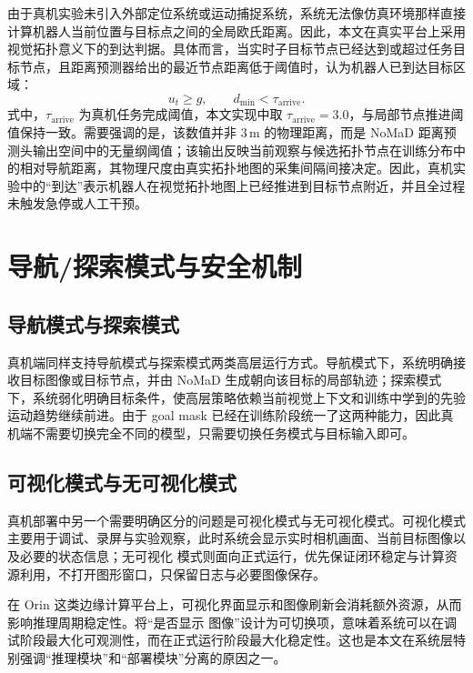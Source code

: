由于真机实验未引入外部定位系统或运动捕捉系统，系统无法像仿真环境那样直接计算机器人当前位置与目标点之间的全局欧氏距离。因此，本文在真实平台上采用视觉拓扑意义下的到达判据。具体而言，当实时子目标节点已经达到或超过任务目标节点，且距离预测器给出的最近节点距离低于阈值时，认为机器人已到达目标区域：
\begin{equation}
u_t \ge g,\qquad d_{\min}<\tau_{\mathrm{arrive}}.
\end{equation}
式中，$\tau_{\mathrm{arrive}}$ 为真机任务完成阈值，本文实现中取 $\tau_{\mathrm{arrive}}=3.0$，与局部节点推进阈值保持一致。需要强调的是，该数值并非 $3\,\mathrm{m}$ 的物理距离，而是 NoMaD 距离预测头输出空间中的无量纲阈值；该输出反映当前观察与候选拓扑节点在训练分布中的相对导航距离，其物理尺度由真实拓扑地图的采集间隔间接决定。因此，真机实验中的“到达”表示机器人在视觉拓扑地图上已经推进到目标节点附近，并且全过程未触发急停或人工干预。

\section{导航/探索模式与安全机制}

\subsection{导航模式与探索模式}

真机端同样支持导航模式与探索模式两类高层运行方式。导航模式下，系统明确接收目标图像或目标节点，并由 NoMaD
生成朝向该目标的局部轨迹；探索模式下，系统弱化明确目标条件，使高层策略依赖当前视觉上下文和训练中学到的先验运动趋势继续前进。由于 goal mask
已经在训练阶段统一了这两种能力\cite{nomad2023}，因此真机端不需要切换完全不同的模型，只需要切换任务模式与目标输入即可。


\subsection{可视化模式与无可视化模式}

真机部署中另一个需要明确区分的问题是可视化模式与无可视化模式。可视化模式主要用于调试、录屏与实验观察，此时系统会显示实时相机画面、当前目标图像以及必要的状态信息；无可视化
模式则面向正式运行，优先保证闭环稳定与计算资源利用，不打开图形窗口，只保留日志与必要图像保存。

在 Orin 这类边缘计算平台上，可视化界面显示和图像刷新会消耗额外资源，从而影响推理周期稳定性。将``是否显示
图像''设计为可切换项，意味着系统可以在调试阶段最大化可观测性，而在正式运行阶段最大化稳定性。这也是本文在系统层特别强调``推理模块''和``部署模块''分离的原因之一。

